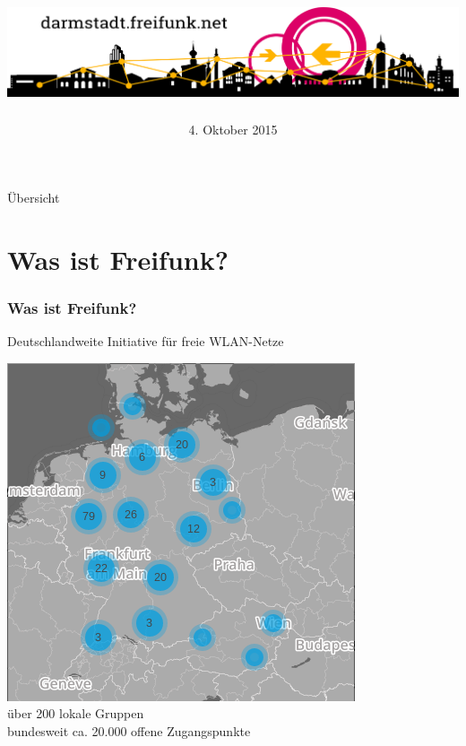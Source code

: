 \documentclass[10pt,handout]{beamer}
\title{\centering\includegraphics[width=\textwidth]{images/logo-skyline}}
\author{}
\date{\footnotesize 4. Oktober 2015}
\begin{document}
\begin{frame}
\maketitle
\end{frame}


\begin{frame}{Übersicht}
\tableofcontents
\end{frame}

\section{Was ist Freifunk?}
\begin{frame}
	\frametitle{Was ist Freifunk?}

	Deutschlandweite Initiative für freie WLAN-Netze
	
	\pause
	\vfill
	\centering
	\includegraphics[scale=0.3]{images/2015-10_freifunk-map} \\
	über 200 lokale Gruppen\\bundesweit ca. 20.000 offene Zugangspunkte

	
\end{frame}
\end{document}

